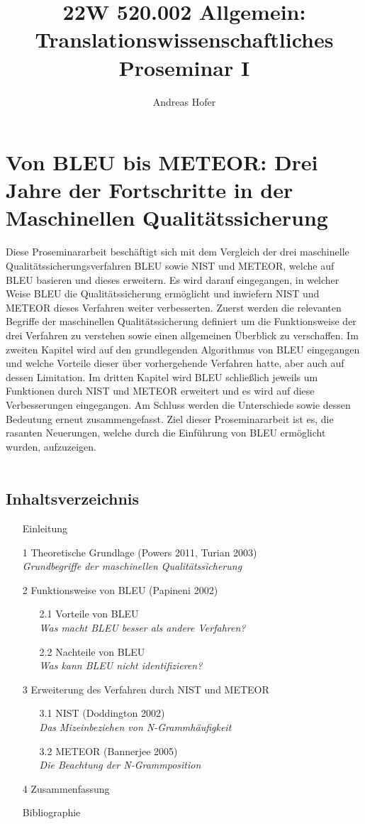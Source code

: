 \documentclass[12pt]{report}
\title{\vspace{-3cm}22W 520.002 Allgemein: Translationswissenschaftliches Proseminar I}
\author{Andreas Hofer}
\begin{document}
	\section*{Von BLEU bis METEOR: Drei Jahre der Fortschritte in der Maschinellen Qualitätssicherung}
	Diese Proseminararbeit beschäftigt sich mit dem Vergleich der drei maschinelle Qualitätssicherungsverfahren BLEU sowie NIST und METEOR, welche auf BLEU basieren und dieses erweitern. Es wird darauf eingegangen, in welcher Weise BLEU die Qualitätssicherung ermöglicht und inwiefern NIST und METEOR dieses Verfahren weiter verbesserten. Zuerst werden die relevanten Begriffe der maschinellen Qualitätssicherung definiert um die Funktionsweise der drei Verfahren zu verstehen sowie einen allgemeinen Überblick zu verschaffen. Im zweiten Kapitel wird auf den grundlegenden Algorithmus von BLEU eingegangen und welche Vorteile dieser über vorhergehende Verfahren hatte, aber auch auf dessen Limitation. Im dritten Kapitel wird BLEU schließlich jeweils um Funktionen durch NIST und METEOR erweitert und es wird auf diese Verbesserungen eingegangen. Am Schluss werden die Unterschiede sowie dessen Bedeutung erneut zusammengefasst. Ziel dieser Proseminararbeit ist es, die rasanten Neuerungen, welche durch die Einführung von BLEU ermöglicht wurden, aufzuzeigen. \\ \\
	\subsection*{Inhaltsverzeichnis}
	\begin{itemize}
		\item[]{Einleitung}
		\item[1]{Theoretische Grundlage (Powers 2011, Turian 2003) \\ {\footnotesize\textit{Grundbegriffe der maschinellen Qualitätssicherung}}}
		\item[2]{Funktionsweise von BLEU (Papineni 2002)}
		\begin{itemize}
			\item[2.1]{Vorteile von BLEU \\ {\footnotesize\textit{Was macht BLEU besser als andere Verfahren?}}}
			\item[2.2]{Nachteile von BLEU \\ {\footnotesize\textit{Was kann BLEU nicht identifizieren?}}}
		\end{itemize}
		\item[3]{Erweiterung des Verfahren durch NIST und METEOR}
		\begin{itemize}
			\item[3.1]{NIST (Doddington 2002) \\ {\footnotesize\textit{Das Mizeinbeziehen von N-Grammhäufigkeit}}}
			\item[3.2]{METEOR (Bannerjee 2005) \\ {\footnotesize\textit{Die Beachtung der N-Grammposition}}}
		\end{itemize}
		\item[4]{Zusammenfassung}
		\item[]{Bibliographie}
	\end{itemize}
\end{document}

